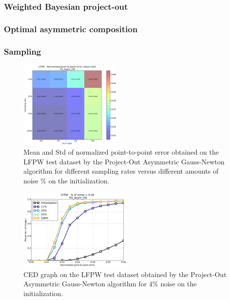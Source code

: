 \subsubsection{Weighted Bayesian project-out}

\subsubsection{Optimal asymmetric composition}

\subsubsection{Sampling}

\begin{figure}[h!]
    \centering
    \includegraphics[width=0.45\textwidth]{experiments/noise_vs_sampling/po_asymmetric_gn/noise_vs_sampling_po_asymmetric.png}
    \caption{Mean and Std of normalized point-to-point error obtained on the LFPW test dataset by the Project-Out Asymmetric Gauss-Newton algorithm for different sampling rates versus different amounts of noise \% on the initialization.}
    \label{fig:noise_vs_sampling_po_asymmetric}
\end{figure}

\begin{figure}[h!]
    \centering
    \includegraphics[width=0.50\textwidth]{experiments/noise_vs_sampling/po_asymmetric_gn/ced_po_asymmetric_gn_4.png}
    \caption{CED graph on the LFPW test dataset obtained by the Project-Out Asymmetric Gauss-Newton algorithm for $4$\% noise on the initialization.}
    \label{fig:ced_po_asymmetric_gn_4}
\end{figure}

